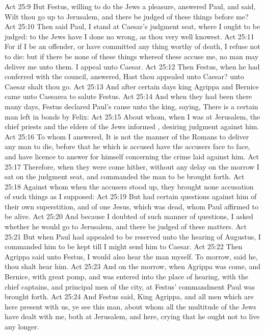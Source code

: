 \vs Act 25:9 But Festus, willing to do the Jews a pleasure, answered Paul, and said, Wilt thou go up to Jerusalem, and there be judged of these things before me?
\vs Act 25:10 Then said Paul, I stand at Caesar's judgment seat, where I ought to be judged: to the Jews have I done no wrong, as thou very well knowest.
\vs Act 25:11 For if I be an offender, or have committed any thing worthy of death, I refuse not to die: but if there be none of these things whereof these accuse me, no man may deliver me unto them. I appeal unto Caesar.
\vs Act 25:12 Then Festus, when he had conferred with the council, answered, Hast thou appealed unto Caesar? unto Caesar shalt thou go.
\vs Act 25:13 And after certain days king Agrippa and Bernice came unto Caesarea to salute Festus.
\vs Act 25:14 And when they had been there many days, Festus declared Paul's cause unto the king, saying, There is a certain man left in bonds by Felix:
\vs Act 25:15 About whom, when I was at Jerusalem, the chief priests and the elders of the Jews informed , desiring  judgment against him.
\vs Act 25:16 To whom I answered, It is not the manner of the Romans to deliver any man to die, before that he which is accused have the accusers face to face, and have licence to answer for himself concerning the crime laid against him.
\vs Act 25:17 Therefore, when they were come hither, without any delay on the morrow I sat on the judgment seat, and commanded the man to be brought forth.
\vs Act 25:18 Against whom when the accusers stood up, they brought none accusation of such things as I supposed:
\vs Act 25:19 But had certain questions against him of their own superstition, and of one Jesus, which was dead, whom Paul affirmed to be alive.
\vs Act 25:20 And because I doubted of such manner of questions, I asked  whether he would go to Jerusalem, and there be judged of these matters.
\vs Act 25:21 But when Paul had appealed to be reserved unto the hearing of Augustus, I commanded him to be kept till I might send him to Caesar.
\vs Act 25:22 Then Agrippa said unto Festus, I would also hear the man myself. To morrow, said he, thou shalt hear him.
\vs Act 25:23 And on the morrow, when Agrippa was come, and Bernice, with great pomp, and was entered into the place of hearing, with the chief captains, and principal men of the city, at Festus' commandment Paul was brought forth.
\vs Act 25:24 And Festus said, King Agrippa, and all men which are here present with us, ye see this man, about whom all the multitude of the Jews have dealt with me, both at Jerusalem, and  here, crying that he ought not to live any longer.
